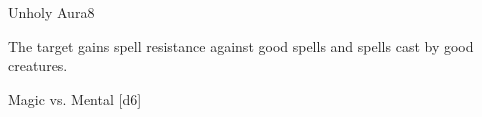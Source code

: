 
\begin{spellsection}{Unholy Aura}{8}
    \begin{spellheader}
    \end{spellheader}
    \begin{spellcontent}
        \begin{spelltargetinginfo}
        \end{spelltargetinginfo}
        \begin{spelleffects}
            \spelleffect The target gains spell resistance against good spells and spells cast by good creatures.
            \spelldur \durshort \dismissable
        \end{spelleffects}
    \end{spellcontent}
    \begin{spellsubcontent}
        \begin{spelltargetinginfo}
        \end{spelltargetinginfo}
        \begin{spelleffects}
            \begin{spellattack}{Magic vs. Mental}
                \spellsuccess {}[d6]
            \end{spellattack}
        \end{spelleffects}
    \end{spellsubcontent}
    \begin{spellfooter}
        \miscastexplode
    \end{spellfooter}
\end{spellsection}

